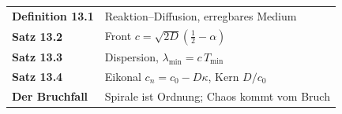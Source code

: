 \begin{merksatz}
\begin{center}
\renewcommand{\arraystretch}{1.5}
\begin{tabular}{@{}P{3.0cm}P{5.6cm}@{}}
\toprule
\textbf{Definition 13.1} & Reaktion--Diffusion, erregbares Medium\\
\textbf{Satz 13.2} & Front $c = \sqrt{2D}(\tfrac12 - \alpha)$\\
\textbf{Satz 13.3} & Dispersion, $\lambda_{\min} = c\,T_{\min}$\\
\textbf{Satz 13.4} & Eikonal $c_{n} = c_{0} - D\kappa$, Kern $D/c_{0}$\\
\textbf{Der Bruchfall} & Spirale ist Ordnung; Chaos kommt vom Bruch\\
\bottomrule
\end{tabular}
\end{center}

\begin{center}
\begin{minipage}{0.88\textwidth}
\end{minipage}
\end{center}
\end{merksatz}
